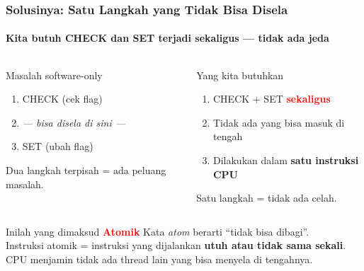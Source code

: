 \documentclass[t,aspectratio=169,xcolor=dvipsnames]{beamer}
\newcommand{\tem}[1]{\textbf{\textcolor{red}{#1}}}
\begin{document}
\begin{frame}[shrink=5]
    \frametitle{Solusinya: Satu Langkah yang Tidak Bisa Disela}
    \framesubtitle{Kita butuh CHECK dan SET terjadi sekaligus — tidak ada jeda}
    \small

    \begin{columns}[T]
        \begin{alertblock}{Masalah software-only}
            \begin{enumerate}
                \item CHECK (cek flag)
                \item \textit{--- bisa disela di sini ---}
                \item SET (ubah flag)
            \end{enumerate}
            Dua langkah terpisah = ada peluang masalah.
        \end{alertblock}

        \begin{exampleblock}{Yang kita butuhkan}
            \begin{enumerate}
                \item CHECK + SET \tem{sekaligus}
                \item Tidak ada yang bisa masuk di tengah
                \item Dilakukan dalam \textbf{satu instruksi CPU}
            \end{enumerate}
            Satu langkah = tidak ada celah.
        \end{exampleblock}
    \end{columns}

    \vspace{0.4em}
    \begin{block}{Inilah yang dimaksud \tem{Atomik}}
        \centering
        Kata \textit{atom} berarti ``tidak bisa dibagi''.\\
        Instruksi atomik = instruksi yang dijalankan \textbf{utuh atau tidak sama sekali}.\\
        CPU menjamin tidak ada thread lain yang bisa menyela di tengahnya.
    \end{block}
\end{frame}
\end{document}
